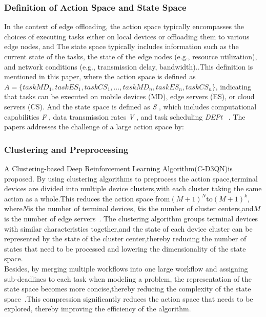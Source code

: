 \documentclass[journal]{IEEEtran}
\begin{document}
\subsubsection{Definition of Action Space and State Space}
In the context of edge offloading, the action space typically encompasses the choices of executing tasks either on local devices or offloading them to various edge nodes, and The state space typically includes information such as the current state of the tasks, the state of the edge nodes (e.g., resource utilization), and network conditions (e.g., transmission delay, bandwidth)..This definition is mentioned in this paper, where the action space is defined as \(A=\{\textit{taskMD}_1,\textit{taskES}_1,\textit{taskCS}_1,\ldots,\textit{taskMD}_n,\textit{taskES}_n,\textit{taskCS}_n\}\), indicating that tasks can be executed on mobile devices (MD), edge servers (ES), or cloud servers (CS). And the state space is defined as \textit{S} , which includes computational capabilities \textit{F} , data transmission rates \textit{V} , and task scheduling \textit{DEPt} ~\cite{zhou01}. The papers addresses the challenge of a large action space by:

\subsubsection{Clustering and Preprocessing}
A Clustering-based Deep Reinforcement Learning Algorithm(C-D3QN)is proposed. By using clustering algorithms to preprocess the action space,terminal devices are divided into multiple device clusters,with each cluster taking the same action as a whole.This reduces the action space from\((M+1)^N\)to\((M+1)^k\), where\(N\)is the number of terminal devices, \(k\)is the number of cluster centers,and\(M\)is the number of edge servers~\cite{zhou03}. The clustering algorithm groups terminal devices with similar characteristics together,and the state of each device cluster can be represented by the state of the cluster center,thereby reducing the number of states that need to be processed and lowering the dimensionality of the state space. \\ Besides, by merging multiple workflows into one large workflow and assigning sub-deadlines to each task when modeling a problem, the representation of the state space becomes more concise,thereby reducing the complexity of the state space~\cite{xyj01}.This compression significantly reduces the action space that needs to be explored, thereby improving the efficiency of the algorithm.
\end{document}
